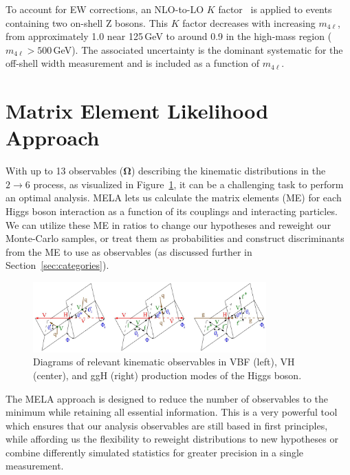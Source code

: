 To account for EW corrections, an NLO-to-LO $K$ factor~\cite{Bierweiler:2013dja} is applied to events containing two on-shell Z bosons. This $K$ factor decreases with increasing $m_{4\ell}$, from approximately 1.0 near 125\,GeV to around 0.9 in the high-mass region ($m_{4\ell} > 500$\,GeV). The associated uncertainty is the dominant systematic for the off-shell width measurement and is included as a function of $m_{4\ell}$.


\section{Matrix Element Likelihood Approach} \label{sec:mela}

With up to 13 observables ($\boldsymbol{\Omega}$) describing the \Hboson kinematic distributions in the $2\to 6$ process, as visualized in Figure~\ref{fig:MELA}, it can be a challenging task to perform an optimal analysis. %
MELA lets us calculate the matrix elements (ME) for each Higgs boson interaction as a function of its couplings and interacting particles. We can utilize these ME in ratios to change our hypotheses and reweight our Monte-Carlo samples, or treat them as probabilities and construct discriminants from the ME to use as observables (as discussed further in Section~\ref{sec:categories}). 

\begin{figure}[!htb]
\centering
\includegraphics[width=0.8\textwidth,clip] {figures/MELA.jpg}
\caption{Diagrams of relevant kinematic observables in VBF (left), VH (center), and ggH (right) production modes of the Higgs boson.}
\label{fig:MELA}
\end{figure}

The MELA approach is designed to reduce the number of observables to the minimum while retaining all essential information. This is a very powerful tool which ensures that our analysis observables are still based in first principles, while affording us the flexibility to reweight distributions to new hypotheses or combine differently simulated statistics for greater precision in a single measurement. 

